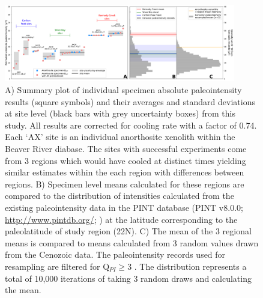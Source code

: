 \documentclass[9pt,twoside,lineno]{pnas-new}
\begin{document}
\begin{figure}[h!]
\noindent\includegraphics[width=0.9\textwidth]{Cenozoic_resample_SI.pdf}
\centering
\caption{\footnotesize{A) Summary plot of individual specimen absolute paleointensity results (square symbols) and their averages and standard deviations at site level (black bars with grey uncertainty boxes) from this study. All results are corrected for cooling rate with a factor of 0.74. Each `AX' site is an individual anorthosite xenolith within the Beaver River diabase. The sites with successful experiments come from 3 regions which would have cooled at distinct times yielding similar estimates within the each region with differences between regions. B) Specimen level means calculated for these regions are compared to the distribution of intensities calculated from the existing paleointensity data in the PINT database (PINT v8.0.0; \url{http://www.pintdb.org/}; \citealp{Bono2021a}) at the latitude corresponding to the paleolatitude of study region (22\textdegree N). C) The mean of the 3 regional means is compared to means calculated from 3 random values drawn from the Cenozoic data. The paleointensity records used for resampling are filtered for Q$_{PI} \geq$3 \cite{Biggin2014a}. The distribution represents a total of 10,000 iterations of taking 3 random draws and calculating the mean.}}
\label{fig:Cenozoic_PINT}
\end{figure}


\clearpage
\end{document}
